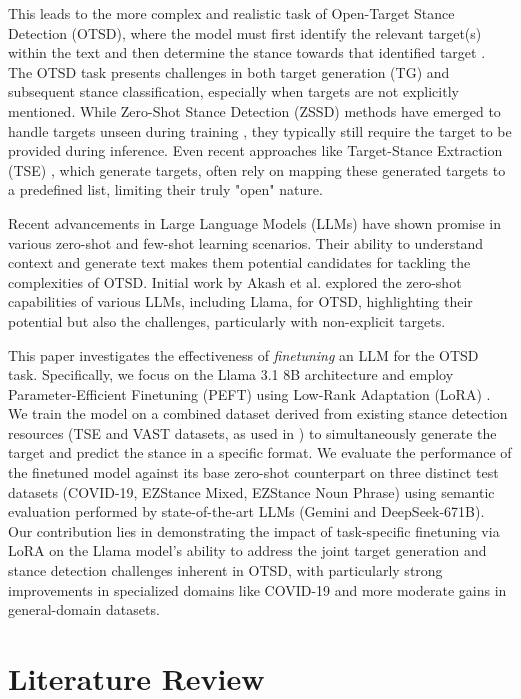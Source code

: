 \documentclass[twocolumn,11pt,letterpaper]{article}
\begin{document}
This leads to the more complex and realistic task of Open-Target Stance Detection (OTSD), where the model must first identify the relevant target(s) within the text and then determine the stance towards that identified target \cite{akash2024}. The OTSD task presents challenges in both target generation (TG) and subsequent stance classification, especially when targets are not explicitly mentioned. While Zero-Shot Stance Detection (ZSSD) methods have emerged to handle targets unseen during training \cite{vast}, they typically still require the target to be provided during inference. Even recent approaches like Target-Stance Extraction (TSE) , which generate targets, often rely on mapping these generated targets to a predefined list, limiting their truly "open" nature.

Recent advancements in Large Language Models (LLMs) have shown promise in various zero-shot and few-shot learning scenarios. Their ability to understand context and generate text makes them potential candidates for tackling the complexities of OTSD. Initial work by Akash et al. \cite{akash2024} explored the zero-shot capabilities of various LLMs, including Llama, for OTSD, highlighting their potential but also the challenges, particularly with non-explicit targets.

This paper investigates the effectiveness of \textit{finetuning} an LLM for the OTSD task. Specifically, we focus on the Llama 3.1 8B architecture \cite{llama3.1} and employ Parameter-Efficient Finetuning (PEFT) using Low-Rank Adaptation (LoRA) \cite{lora}. We train the model on a combined dataset derived from existing stance detection resources (TSE and VAST datasets, as used in \cite{akash2024}) to simultaneously generate the target and predict the stance in a specific format. We evaluate the performance of the finetuned model against its base zero-shot counterpart on three distinct test datasets (COVID-19, EZStance Mixed, EZStance Noun Phrase) using semantic evaluation performed by state-of-the-art LLMs (Gemini and DeepSeek-671B). Our contribution lies in demonstrating the impact of task-specific finetuning via LoRA on the Llama model's ability to address the joint target generation and stance detection challenges inherent in OTSD, with particularly strong improvements in specialized domains like COVID-19 and more moderate gains in general-domain datasets.

\section{Literature Review}
\label{sec:literature}
\end{document}
